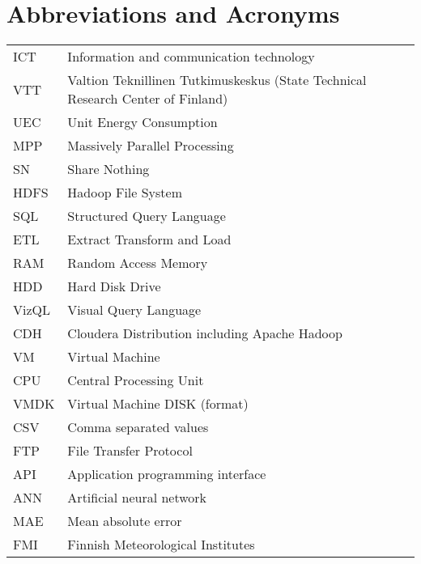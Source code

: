 \chapter*{Abbreviations and Acronyms}


\noindent
\begin{longtable}{@{}p{}p{}@{}}
ICT & Information and communication technology \\
VTT & Valtion Teknillinen Tutkimuskeskus (State Technical Research Center of Finland) \\ 
UEC & Unit Energy Consumption \\ 
MPP  & Massively Parallel Processing \\
SN & Share Nothing \\ 
HDFS & Hadoop File System\\
SQL & Structured Query Language\\
ETL & Extract Transform and Load\\
RAM & Random Access Memory\\
HDD & Hard Disk Drive\\
VizQL & Visual Query Language\\
CDH & Cloudera Distribution including Apache Hadoop\\
VM & Virtual Machine\\
CPU & Central Processing Unit\\
VMDK & Virtual Machine DISK (format)\\
CSV & Comma separated values\\
FTP & File Transfer Protocol\\
API & Application programming interface\\
ANN & Artificial neural network\\
MAE & Mean absolute error\\
FMI & Finnish Meteorological Institutes\\
\end{longtable}
